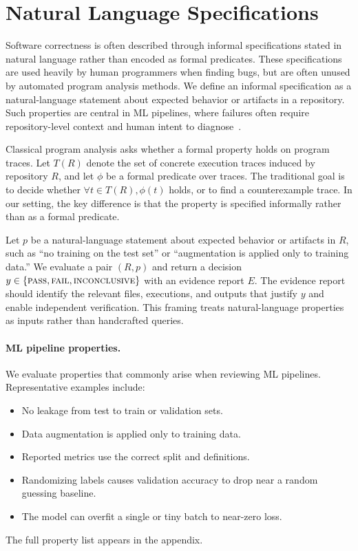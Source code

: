 \documentclass[11pt]{article}
\begin{document}
\section{Natural Language Specifications}

Software correctness is often described through informal specifications stated in natural language rather than encoded as formal predicates.
These specifications are used heavily by human programmers when finding bugs, but are often unused by automated program analysis methods.
We define an informal specification as a natural-language statement about expected behavior or artifacts in a repository.
Such properties are central in ML pipelines, where failures often require repository-level context and human intent to diagnose~\citep{schoop2021umlaut}.

Classical program analysis asks whether a formal property holds on program traces.
Let $T(R)$ denote the set of concrete execution traces induced by repository $R$, and let $\phi$ be a formal predicate over traces.
The traditional goal is to decide whether $\forall t \in T(R), \phi(t)$ holds, or to find a counterexample trace.
In our setting, the key difference is that the property is specified informally rather than as a formal predicate.

Let $p$ be a natural-language statement about expected behavior or artifacts in $R$, such as ``no training on the test set'' or ``augmentation is applied only to training data.''
We evaluate a pair $(R,p)$ and return a decision $y \in \{\textsc{pass},\textsc{fail},\textsc{inconclusive}\}$ with an evidence report $E$.
The evidence report should identify the relevant files, executions, and outputs that justify $y$ and enable independent verification.
This framing treats natural-language properties as inputs rather than handcrafted queries.

\paragraph{ML pipeline properties.}
We evaluate properties that commonly arise when reviewing ML pipelines.
Representative examples include:
\begin{itemize}
  \item No leakage from test to train or validation sets.
  \item Data augmentation is applied only to training data.
  \item Reported metrics use the correct split and definitions.
  \item Randomizing labels causes validation accuracy to drop near a random guessing baseline.
  \item The model can overfit a single or tiny batch to near-zero loss.
\end{itemize}
The full property list appears in the appendix.
\end{document}
